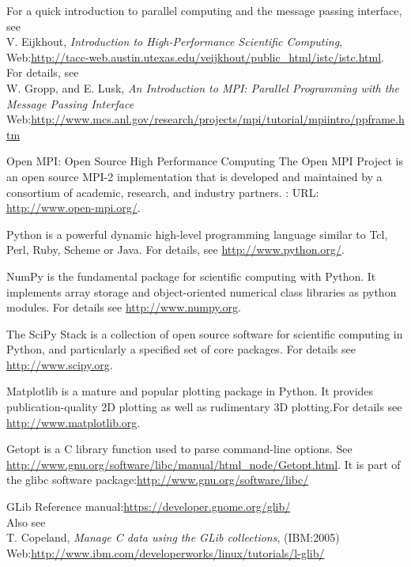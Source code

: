 \documentclass[a4paper,10pt]{article}
\begin{document}
\begin{thebibliography}{10}
\newblock For a quick introduction to parallel computing and the message passing interface, see \\
\newblock V. Eijkhout,
{\em Introduction to High-Performance Scientific Computing},
\newblock Web:\url{http://tacc-web.austin.utexas.edu/veijkhout/public_html/istc/istc.html}.\\
For details, see \\
\newblock W. Gropp, and E. Lusk,
{\em An Introduction to MPI: Parallel Programming with the Message Passing Interface}\\
\newblock Web:\url{http://www.mcs.anl.gov/research/projects/mpi/tutorial/mpiintro/ppframe.htm}

\newblock Open MPI: Open Source High Performance Computing
\newblock The Open MPI Project is an open source MPI-2 implementation that is developed and maintained by a consortium of academic, research, and industry partners.
\newblock: URL: \url{http://www.open-mpi.org/}.

Python is a powerful dynamic high-level programming language similar to Tcl, Perl, Ruby, Scheme or Java. For details, see \url{http://www.python.org/}.

NumPy is the fundamental package for scientific computing with Python. It implements array storage and object-oriented numerical class libraries as python modules. For details see \url{http://www.numpy.org}.

The SciPy Stack is a collection of open source software for scientific computing in Python, and particularly a specified set of core packages. For details see \url{http://www.scipy.org}.

Matplotlib is a mature and popular plotting package in Python. It provides publication-quality 2D plotting as well as rudimentary 3D plotting.For details see \url{http://www.matplotlib.org}.

Getopt is a C library function used to parse command-line options. See \url{http://www.gnu.org/software/libc/manual/html_node/Getopt.html}. It is part of the glibc software package:\url{http://www.gnu.org/software/libc/}

\newblock GLib Reference manual:\url{https://developer.gnome.org/glib/}\\
Also see \\
\newblock T. Copeland, {\em Manage C data using the GLib collections}, (IBM:2005)
\newblock Web:\url{http://www.ibm.com/developerworks/linux/tutorials/l-glib/}


\end{thebibliography}
\end{document}
